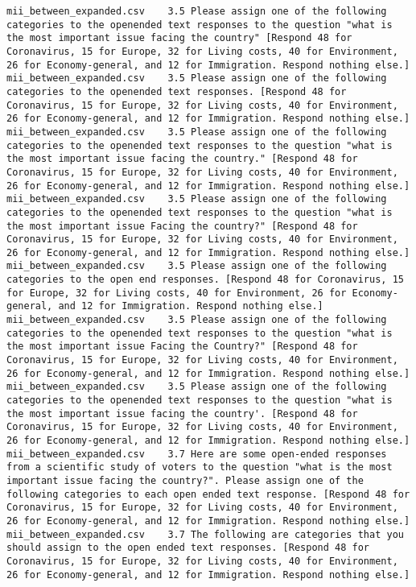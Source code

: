 \begin{lstlisting}[label=lst:promptvariants]
mii_between_expanded.csv	3.5	Please assign one of the following categories to the openended text responses to the question "what is the most important issue facing the country" [Respond 48 for Coronavirus, 15 for Europe, 32 for Living costs, 40 for Environment, 26 for Economy-general, and 12 for Immigration. Respond nothing else.]
mii_between_expanded.csv	3.5	Please assign one of the following categories to the openended text responses. [Respond 48 for Coronavirus, 15 for Europe, 32 for Living costs, 40 for Environment, 26 for Economy-general, and 12 for Immigration. Respond nothing else.]
mii_between_expanded.csv	3.5	Please assign one of the following categories to the openended text responses to the question "what is the most important issue facing the country." [Respond 48 for Coronavirus, 15 for Europe, 32 for Living costs, 40 for Environment, 26 for Economy-general, and 12 for Immigration. Respond nothing else.]
mii_between_expanded.csv	3.5	Please assign one of the following categories to the openended text responses to the question "what is the most important issue Facing the country?" [Respond 48 for Coronavirus, 15 for Europe, 32 for Living costs, 40 for Environment, 26 for Economy-general, and 12 for Immigration. Respond nothing else.]
mii_between_expanded.csv	3.5	Please assign one of the following categories to the open end responses. [Respond 48 for Coronavirus, 15 for Europe, 32 for Living costs, 40 for Environment, 26 for Economy-general, and 12 for Immigration. Respond nothing else.]
mii_between_expanded.csv	3.5	Please assign one of the following categories to the openended text responses to the question "what is the most important issue Facing the Country?" [Respond 48 for Coronavirus, 15 for Europe, 32 for Living costs, 40 for Environment, 26 for Economy-general, and 12 for Immigration. Respond nothing else.]
mii_between_expanded.csv	3.5	Please assign one of the following categories to the openended text responses to the question "what is the most important issue facing the country'. [Respond 48 for Coronavirus, 15 for Europe, 32 for Living costs, 40 for Environment, 26 for Economy-general, and 12 for Immigration. Respond nothing else.]
mii_between_expanded.csv	3.7	Here are some open-ended responses from a scientific study of voters to the question "what is the most important issue facing the country?". Please assign one of the following categories to each open ended text response. [Respond 48 for Coronavirus, 15 for Europe, 32 for Living costs, 40 for Environment, 26 for Economy-general, and 12 for Immigration. Respond nothing else.]
mii_between_expanded.csv	3.7	The following are categories that you should assign to the open ended text responses. [Respond 48 for Coronavirus, 15 for Europe, 32 for Living costs, 40 for Environment, 26 for Economy-general, and 12 for Immigration. Respond nothing else.]

\end{lstlisting}
